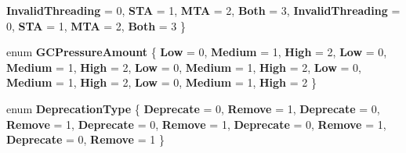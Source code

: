 \begin{DoxyCompactItemize}
{\bfseries Invalid\+Threading} = 0, 
{\bfseries S\+TA} = 1, 
{\bfseries M\+TA} = 2, 
{\bfseries Both} = 3, 
\newline
{\bfseries Invalid\+Threading} = 0, 
{\bfseries S\+TA} = 1, 
{\bfseries M\+TA} = 2, 
{\bfseries Both} = 3
 \}
\item 
\mbox{\label{namespace_windows_1_1_foundation_1_1_metadata_a877de1cc5a89f9df6ace56ccf9883aa4}} 
enum {\bfseries G\+C\+Pressure\+Amount} \{ \newline
{\bfseries Low} = 0, 
{\bfseries Medium} = 1, 
{\bfseries High} = 2, 
{\bfseries Low} = 0, 
\newline
{\bfseries Medium} = 1, 
{\bfseries High} = 2, 
{\bfseries Low} = 0, 
{\bfseries Medium} = 1, 
\newline
{\bfseries High} = 2, 
{\bfseries Low} = 0, 
{\bfseries Medium} = 1, 
{\bfseries High} = 2, 
\newline
{\bfseries Low} = 0, 
{\bfseries Medium} = 1, 
{\bfseries High} = 2
 \}
\item 
\mbox{\label{namespace_windows_1_1_foundation_1_1_metadata_a6012664166c4aca6e08f2f623e42d611}} 
enum {\bfseries Deprecation\+Type} \{ \newline
{\bfseries Deprecate} = 0, 
{\bfseries Remove} = 1, 
{\bfseries Deprecate} = 0, 
{\bfseries Remove} = 1, 
\newline
{\bfseries Deprecate} = 0, 
{\bfseries Remove} = 1, 
{\bfseries Deprecate} = 0, 
{\bfseries Remove} = 1, 
\newline
{\bfseries Deprecate} = 0, 
{\bfseries Remove} = 1
 \}
\end{DoxyCompactItemize}
